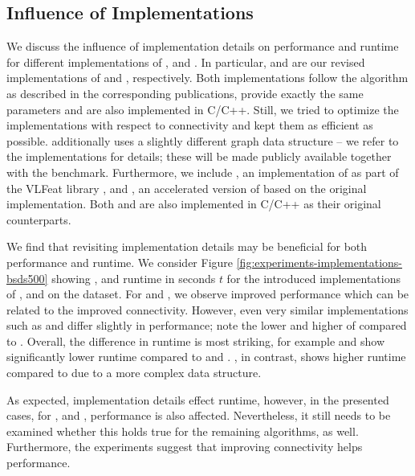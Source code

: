 \subsection{Influence of Implementations}
\label{subsec:experiments-implementations}

We discuss the influence of implementation details on performance and runtime for
different implementations of \SEEDS, \SLIC and \FH. In particular, \reSEEDS and \reFH 
are our revised implementations of \SEEDS and \FH, respectively. 
Both implementations follow the algorithm as described in the corresponding publications,
provide exactly the same parameters and are also implemented in C/C++.
Still, we tried to optimize the implementations with respect to connectivity and
kept them as efficient as possible. 
\reFH additionally uses a slightly different graph data structure -- we refer to the
implementations for details; these will be made publicly available together with the benchmark.
Furthermore, we include \vlSLIC, an implementation of \SLIC as part of the VLFeat library
\cite{VedaldiFulkerson:2008}, and \preSLIC \cite{NeubertProtzel:2014}, an accelerated version of \SLIC based on the
original implementation. Both \vlSLIC and \preSLIC are also implemented in C/C++ as
their original counterparts.

We find that revisiting implementation details may be beneficial for both performance and runtime.
We consider Figure \ref{fig:experiments-implementations-bsds500} showing \Rec, \UE
and runtime in seconds $t$ for the introduced implementations of \SLIC, \SEEDS and \FH on the \BSDS dataset.
For \reSEEDSr and \reFHr, we observe improved performance which can be related to
the improved connectivity. However, even very similar implementations such as \SLICr
and \vlSLICr differ slightly in performance; note the lower \Rec and higher \UE
of \vlSLICr compared to \SLICr. Overall, the difference in runtime is most striking, for example \reSEEDSr
and \preSLICr show significantly lower runtime compared to \SEEDSr and \SLICr.
\reFHr, in contrast, shows higher runtime compared to \FHr due to a more complex data structure.

As expected, implementation details effect runtime, however, in the presented cases,
\ie for \SLIC, \SEEDS and \FH, performance is also affected. Nevertheless, it
still needs to be examined whether this holds true for the remaining algorithms, as well.
Furthermore, the experiments suggest that improving connectivity helps
performance.
